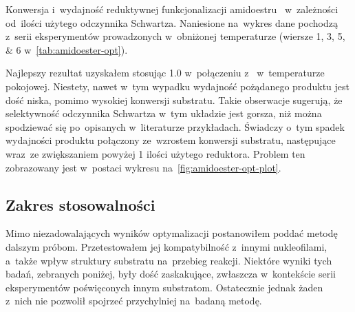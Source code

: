 \begin{marginfigure}
  \caption{
    Konwersja i~wydajność reduktywnej funkcjonalizacji amidoestru~
      w~zależności od~ilości użytego odczynnika Schwartza.
    Naniesione na~wykres dane pochodzą z~serii eksperymentów prowadzonych w~obniżonej temperaturze
      (wiersze \numlist{1; 3; 5; 6} w~\cref{tab:amidoester-opt}).
  }
  \label{fig:amidoester-opt-plot}
\end{marginfigure}
Najlepszy rezultat uzyskałem stosując \SI{1.0}{\equiv} \schwartz{} w~połączeniu
  z~ w~temperaturze pokojowej.
Niestety, nawet w~tym wypadku wydajność pożądanego produktu jest dość niska,
  pomimo wysokiej konwersji substratu.
Takie obserwacje sugerują, że selektywność odczynnika Schwartza w~tym układzie
  jest gorsza, niż można spodziewać się po~opisanych w~literaturze przykładach.
Świadczy o~tym spadek wydajności produktu połączony ze~wzrostem konwersji substratu,
  następujące wraz~ze zwiększaniem powyżej \SI{1}{\equiv} ilości użytego reduktora.
Problem ten zobrazowany jest w~postaci wykresu na~\cref{fig:amidoester-opt-plot}.

\subsection{Zakres stosowalności}
Mimo niezadowalających wyników optymalizacji postanowiłem poddać metodę dalszym próbom.
Przetestowałem jej kompatybilność z~innymi nukleofilami, a~także wpływ struktury substratu
  na~przebieg reakcji.
Niektóre wyniki tych badań, zebranych poniżej, były dość zaskakujące, zwłaszcza w~kontekście
  serii eksperymentów poświęconych innym substratom.
Ostatecznie jednak żaden z~nich nie pozwolił spojrzeć przychylniej na~badaną metodę.

